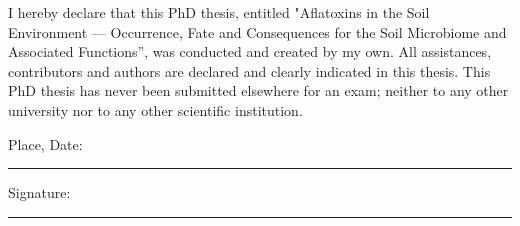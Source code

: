 \begin{declaration}
\addchaptertocentry{\authorshipname} 

I hereby declare that this PhD thesis, entitled "Aflatoxins in the Soil Environment --- Occurrence, Fate and Consequences for the Soil Microbiome and Associated Functions”, was conducted and created by my own. All assistances, contributors and authors are declared and clearly indicated in this thesis. This PhD thesis has never been submitted elsewhere for an exam; neither to any other university nor to any other scientific institution. 

\noindent Place, Date:\\
\rule[0.5em]{25em}{0.5pt} %
 
\noindent Signature:\\
\rule[0.5em]{25em}{0.5pt} %
\end{declaration}